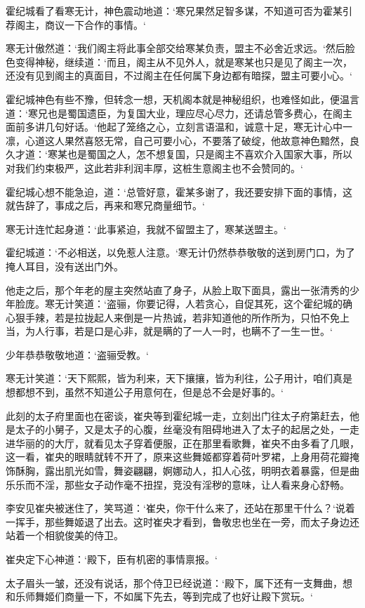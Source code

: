 霍纪城看了看寒无计，神色震动地道：‘寒兄果然足智多谋，不知道可否为霍某引荐阁主，商议一下合作的事情。‘

寒无计傲然道：‘我们阁主将此事全部交给寒某负责，盟主不必舍近求远。‘然后脸色变得神秘，继续道：‘而且，阁主从不见外人，就是寒某也只是见了阁主一次，还没有见到阁主的真面目，不过阁主在任何属下身边都有暗探，盟主可要小心。‘

霍纪城神色有些不豫，但转念一想，天机阁本就是神秘组织，也难怪如此，便温言道：‘寒兄也是蜀国遗臣，为复国大业，理应尽心尽力，还请总管多费心，在阁主面前多讲几句好话。‘他起了笼络之心，立刻言语温和，诚意十足，寒无计心中一凛，心道这人果然喜怒无常，自己可要小心，不要落了破绽，他故意神色黯然，良久才道：‘寒某也是蜀国之人，怎不想复国，只是阁主不喜欢介入国家大事，所以对我们约束极严，这此若非利润丰厚，这桩生意阁主也不会赞同的。‘

霍纪城心想不能急迫，道：‘总管好意，霍某多谢了，我还要安排下面的事情，这就告辞了，事成之后，再来和寒兄商量细节。‘

寒无计连忙起身道：‘此事紧迫，我就不留盟主了，寒某送盟主。‘

霍纪城道：‘不必相送，以免惹人注意。‘寒无计仍然恭恭敬敬的送到房门口，为了掩人耳目，没有送出门外。

他走之后，那个年老的屋主突然站直了身子，从脸上取下面具，露出一张清秀的少年脸庞。寒无计笑道：‘盗骊，你要记得，人若贪心，自促其死，这个霍纪城的确心狠手辣，若是拉拢起人来倒是一片热诚，若非知道他的所作所为，只怕不免上当，为人行事，若是口是心非，就是瞒的了一人一时，也瞒不了一生一世。‘

少年恭恭敬敬地道：‘盗骊受教。‘

寒无计笑道：‘天下熙熙，皆为利来，天下攘攘，皆为利往，公子用计，咱们真是想都想不到，虽然不知道公子用意何在，但是总不会是好事的。‘

此刻的太子府里面也在密谈，崔央等到霍纪城一走，立刻出门往太子府第赶去，他是太子的小舅子，又是太子的心腹，丝毫没有阻碍地进入了太子的起居之处，一走进华丽的的大厅，就看见太子穿着便服，正在那里看歌舞，崔央不由多看了几眼，这一看，崔央的眼睛就转不开了，原来这些舞姬都穿着荷叶罗裙，上身用荷花瓣掩饰酥胸，露出肌光如雪，舞姿翩翩，婀娜动人，扣人心弦，明明衣着暴露，但是曲乐乐而不淫，那些女子动作毫不扭捏，竞没有淫秽的意味，让人看来身心舒畅。

李安见崔央被迷住了，笑骂道：‘崔央，你干什么来了，还站在那里干什么？‘说着一挥手，那些舞姬退了出去。这时崔央才看到，鲁敬忠也坐在一旁，而太子身边还站着一个相貌俊美的侍卫。

崔央定下心神道：‘殿下，臣有机密的事情禀报。‘

太子眉头一皱，还没有说话，那个侍卫已经说道：‘殿下，属下还有一支舞曲，想和乐师舞姬们商量一下，不如属下先去，等到完成了也好让殿下赏玩。‘

